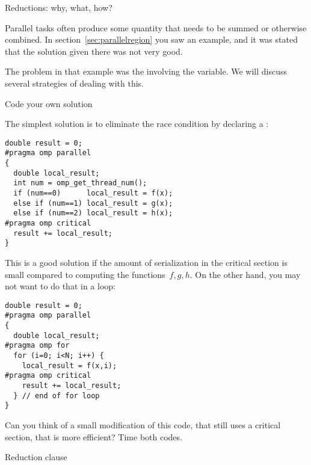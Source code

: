 
\label{sec:reduction}

 {Reductions: why, what, how?}

Parallel tasks often produce some quantity that needs to be summed
or otherwise combined.
In section~\ref{sec:parallelregion} you saw an example, and it was stated that the
solution given there was not very good.

The problem in that example was the  involving the 
variable. We will discuss several strategies of dealing with this.

 {Code your own solution}

The simplest solution is to eliminate the race condition
by declaring a :
\begin{lstlisting}
double result = 0;
#pragma omp parallel
{
  double local_result;
  int num = omp_get_thread_num();
  if (num==0)      local_result = f(x);
  else if (num==1) local_result = g(x);
  else if (num==2) local_result = h(x);
#pragma omp critical
  result += local_result;
}
\end{lstlisting}

This is a good solution if the amount of serialization in the critical section
is small compared to computing the functions~$f,g,h$. On the other hand, you
may not want to do that in a loop:
\begin{lstlisting}
double result = 0;
#pragma omp parallel
{
  double local_result;
#pragma omp for
  for (i=0; i<N; i++) {
    local_result = f(x,i);
#pragma omp critical
    result += local_result;
  } // end of for loop
}
\end{lstlisting}
\begin{exercise}
  Can you think of a small modification of this code, that still uses a critical section,
  that is more efficient? Time both codes.
\end{exercise}

 {Reduction clause}

